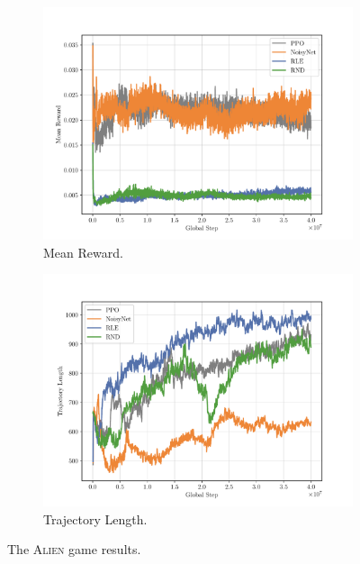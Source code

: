 \begin{figure}[h!]
\begin{subfigure}[b]{0.45\textwidth}
    \includegraphics[width=\textwidth]{figures/plot_Alien_RewardsMean.pdf}
    \caption{Mean Reward.}
    \label{fig:alien-rewards}
  \end{subfigure}
  \hfill
  \begin{subfigure}[b]{0.45\textwidth}
    \centering
    \includegraphics[width=\textwidth]{figures/plot_Alien_TrajectoryLength.pdf}
    \caption{Trajectory Length.}
    \label{fig:alien-trajectorylength}
  \end{subfigure}
  \caption{The \textsc{Alien} game results.}
\end{figure}

